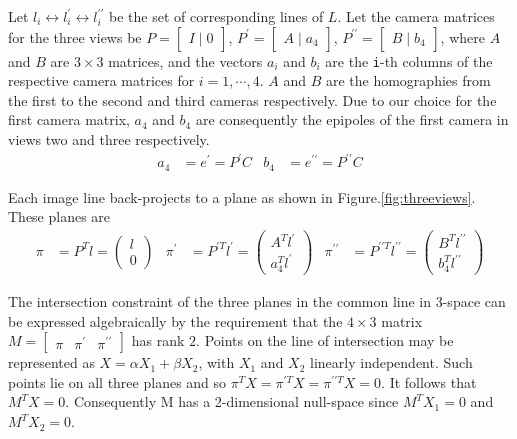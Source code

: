 Let $ l_i \leftrightarrow l^{\prime}_i \leftrightarrow l^{\prime \prime}_i $ be the set of corresponding lines of $L$. Let the camera matrices for the three views be $P =  \begin{bmatrix} I \mid 0 \end{bmatrix}$, $P^{\prime} = \begin{bmatrix} A \mid a_{4} \end{bmatrix}$, $P^{\prime \prime} = \begin{bmatrix} B \mid b_{4} \end{bmatrix}$, where $A$ and $B$ are $3 \times 3$ matrices, and the vectors $a_i$ and $b_i$ are the \texttt{i}-th columns of the respective camera matrices for $i = 1,\dotsb,4$. $A$ and $B$ are the homographies from the first to the second and third cameras respectively. Due to our choice for the first camera matrix, $a_4$ and $b_4$ are consequently the epipoles of the first camera in views two and three respectively.
 \begin{align*}
  a_4 &= e^{\prime} = P^{\prime}C  & b_4 &= e^{\prime \prime}  = P^{\prime \prime}C
 \end{align*}

Each image line back-projects to a plane as shown in Figure.\ref{fig:threeviews}. These planes are
\begin{align*}
\pi &= P^{T}l = \begin{pmatrix} l \\ 0 \end{pmatrix}  & \pi^{\prime} &= P^{\prime T}l^{\prime} = \begin{pmatrix} A^{T}l^{\prime} \\ a^{T}_{4}l^{\prime} \end{pmatrix} & \pi^{\prime \prime} &= P^{\prime \prime T}l^{\prime \prime} = \begin{pmatrix} B^{T}l^{\prime \prime} \\ b^{T}_{4}l^{\prime \prime} \end{pmatrix}
\end{align*}

The intersection constraint of the three planes in the common line in 3-space can be expressed algebraically by the requirement that the $4 \times 3$ matrix $ M = \begin{bmatrix} \pi & \pi^{\prime} & \pi^{\prime \prime} \end{bmatrix}$ has rank $2$. Points on the line of intersection may be represented as $X = \alpha X_1 + \beta X_2$, with $X_1$ and $X_2$ linearly independent. Such points lie on all three planes and so $\pi^{T}X = \pi^{\prime T}X = \pi^{\prime \prime T}X = 0$. It follows that $M^{T}X = 0$. Consequently M has a 2-dimensional null-space since $M^{T}X_1 = 0$ and $M^{T}X_2 =0$.

